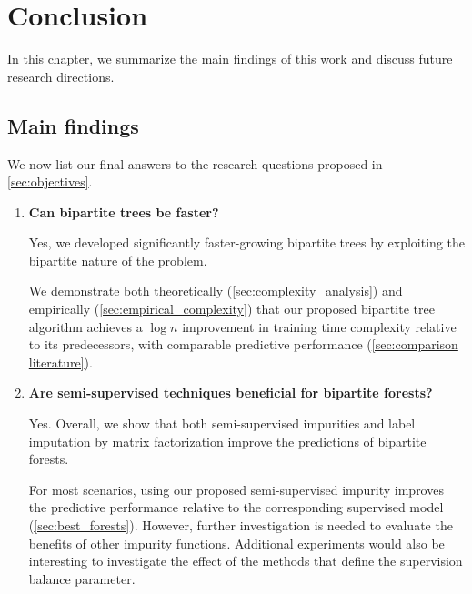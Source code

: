 \chapter{Conclusion}

In this chapter, we summarize the main findings of this work and discuss future research directions.

\section{Main findings}

We now list our final answers to the research questions proposed in \autoref{sec:objectives}.

\begin{enumerate}
    \item \textbf{Can bipartite trees be faster?}

    Yes, we developed significantly faster-growing bipartite trees by exploiting the bipartite nature of the problem.

    We demonstrate both theoretically (\autoref{sec:complexity_analysis}) and empirically (\autoref{sec:empirical_complexity}) that our proposed bipartite tree algorithm achieves a $\log n$ improvement in training time complexity relative to its predecessors, with comparable predictive performance (\autoref{sec:comparison literature}).

    \item \textbf{Are semi-supervised techniques beneficial for bipartite forests?}

    Yes. Overall, we show that both semi-supervised impurities and label imputation by matrix factorization improve the predictions of bipartite forests.%

    For most scenarios, using our proposed semi-supervised impurity improves the predictive performance relative to the corresponding supervised model (\autoref{sec:best_forests}).
    However, further investigation is needed to evaluate the benefits of other impurity functions.
    Additional experiments would also be interesting to investigate the effect of the methods that define the supervision balance parameter.
    

\end{enumerate}
